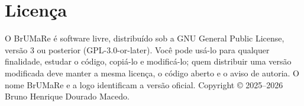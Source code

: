 \documentclass[11pt,a4paper]{article}
\newcommand{\cp}{\textsf{BrUMa\textcolor[HTML]{B26B00}{Re}}}
\begin{document}
\nocite{ganose2018sumo,plotly2015}
\section*{Licença}
O \cp{} é software livre, distribuído sob a GNU General Public License, versão 3 ou posterior (GPL-3.0-or-later). Você pode usá-lo para qualquer finalidade, estudar o código, copiá-lo e modificá-lo; quem distribuir uma versão modificada deve manter a mesma licença, o código aberto e o aviso de autoria. O nome BrUMaRe e a logo identificam a versão oficial. Copyright \copyright{} 2025--2026 Bruno Henrique Dourado Macedo.



\end{document}
